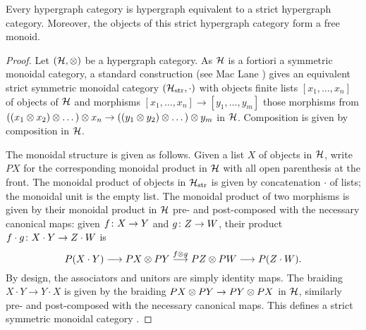 \begin{theorem} \label{thm.stricthypergraphs}
  Every hypergraph category is hypergraph equivalent to a strict hypergraph
  category. Moreover, the objects of this strict hypergraph category form a free
  monoid.
\end{theorem}
\begin{proof}
  Let $(\mathcal H,\otimes)$ be a hypergraph category. As $\mathcal H$ is a fortiori a
  symmetric monoidal category, a standard construction (see Mac Lane
  \cite[Theorem]{Mac98}) gives an equivalent strict symmetric monoidal category
  $(\mathcal H_{\mathrm{str}}, \cdot)$ with objects finite lists $[x_1,\dots,x_n]$ of
  objects of $\mathcal H$ and morphisms $[x_1,\dots,x_n] \to [y_1,\dots,y_m]$ those
  morphisms from $((x_1 \otimes x_2) \otimes \dots) \otimes x_n \to ((y_1 \otimes y_2) \otimes
  \dots) \otimes y_m$ in $\mathcal H$.  Composition is given by composition in $\mathcal H$.
  
  The monoidal structure is given as follows. Given a list $X$ of objects in
  $\mathcal H$, write $PX$ for the corresponding monoidal product in $\mathcal H$ with all
  open parenthesis at the front.  The monoidal product of objects in $\mathcal
  H_{\mathrm{str}}$ is given by concatenation $\cdot$ of lists; the monoidal
  unit is the empty list. The monoidal product of two morphisms is given by
  their monoidal product in $\mathcal H$ pre- and post-composed with the necessary
  canonical maps: given $f{\colon} X \to Y$ and $g{\colon} Z \to W$, their product
  $f\cdot g{\colon} X\cdot Y \to Z \cdot
  W$ is \[ P(X \cdot Y) \longrightarrow PX \otimes PY \stackrel{f \otimes
  g}{\longrightarrow} PZ \otimes PW \longrightarrow P(Z \cdot W).  \] By design, the
  associators and unitors are simply identity maps. The braiding $X \cdot Y \to
  Y \cdot X$ is given by the braiding $PX \otimes PY \to PY \otimes PX$ in $\mathcal H$,
  similarly pre- and post-composed with the necessary canonical maps. This
  defines a strict symmetric monoidal category \cite{Mac98}.


\end{proof}
